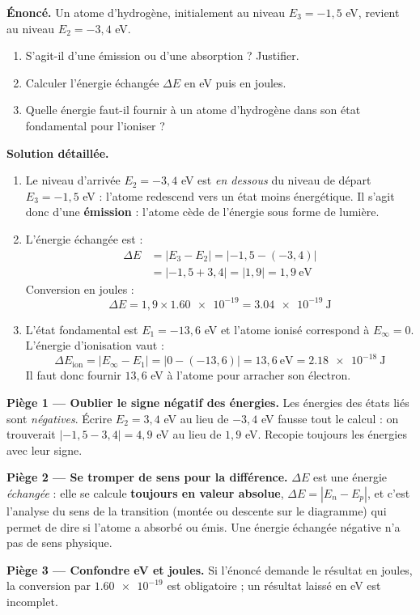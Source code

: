 \documentclass[11pt]{article}
\begin{document}
\begin{exoresolu}
\textbf{Énoncé.} Un atome d'hydrogène, initialement au niveau $E_3 = -1,5$ eV, revient au niveau $E_2 = -3,4$ eV.
\begin{enumerate}
\item S'agit-il d'une émission ou d'une absorption ? Justifier.
\item Calculer l'énergie échangée $\Delta E$ en eV puis en joules.
\item Quelle énergie faut-il fournir à un atome d'hydrogène dans son état fondamental pour l'ioniser ?
\end{enumerate}
\tcblower
\textbf{Solution détaillée.}
\begin{enumerate}
\item Le niveau d'arrivée $E_2 = -3,4$ eV est \emph{en dessous} du niveau de départ $E_3 = -1,5$ eV : l'atome redescend vers un état moins énergétique. Il s'agit donc d'une \textbf{émission} : l'atome cède de l'énergie sous forme de lumière.
\item L'énergie échangée est :
\begin{align*}
\Delta E &= |E_3 - E_2| = |-1,5 - (-3,4)| \\
&= |-1,5 + 3,4| = |1,9| = 1,9~\text{eV}
\end{align*}
Conversion en joules :
\[ \Delta E = 1,9 \times \num{1,60e-19} = \num{3,04e-19}~\text{J} \]
\item L'état fondamental est $E_1 = -13,6$ eV et l'atome ionisé correspond à $E_\infty = 0$. L'énergie d'ionisation vaut :
\[ \Delta E_{\text{ion}} = |E_\infty - E_1| = |0 - (-13,6)| = 13,6~\text{eV} = \num{2,18e-18}~\text{J} \]
Il faut donc fournir $13,6$ eV à l'atome pour arracher son électron.
\end{enumerate}
\end{exoresolu}

\begin{attention}
\textbf{Piège 1 — Oublier le signe négatif des énergies.} Les énergies des états liés sont \emph{négatives}. Écrire $E_2 = 3,4$ eV au lieu de $-3,4$ eV fausse tout le calcul : on trouverait $|-1,5 - 3,4| = 4,9$ eV au lieu de $1,9$ eV. Recopie toujours les énergies avec leur signe.

\textbf{Piège 2 — Se tromper de sens pour la différence.} $\Delta E$ est une énergie \emph{échangée} : elle se calcule \textbf{toujours en valeur absolue}, $\Delta E = |E_n - E_p|$, et c'est l'analyse du sens de la transition (montée ou descente sur le diagramme) qui permet de dire si l'atome a absorbé ou émis. Une énergie échangée négative n'a pas de sens physique.

\textbf{Piège 3 — Confondre eV et joules.} Si l'énoncé demande le résultat en joules, la conversion par $\num{1,60e-19}$ est obligatoire ; un résultat laissé en eV est incomplet.
\end{attention}
\end{document}
